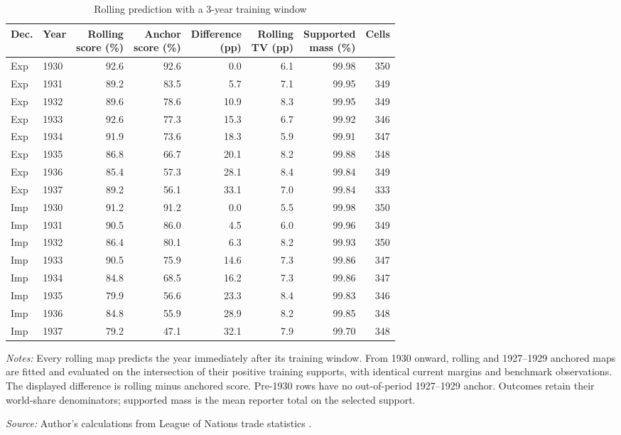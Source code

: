 \begin{table}[!htbp]\centering
\caption{Rolling prediction with a 3-year training window}\label{tab:app_rolling_three}
\begin{threeparttable}\footnotesize\setlength{\tabcolsep}{4pt}
\begin{tabular}{@{}llrrrrrr@{}}
\toprule
Dec. & Year & \shortstack{Rolling\\score (\%)} & \shortstack{Anchor\\score (\%)} & \shortstack{Difference\\(pp)} & \shortstack{Rolling\\TV (pp)} & \shortstack{Supported\\mass (\%)} & Cells \\
\midrule
Exp & 1930 & 92.6 & 92.6 & 0.0 & 6.1 & 99.98 & 350 \\
Exp & 1931 & 89.2 & 83.5 & 5.7 & 7.1 & 99.95 & 349 \\
Exp & 1932 & 89.6 & 78.6 & 10.9 & 8.3 & 99.95 & 349 \\
Exp & 1933 & 92.6 & 77.3 & 15.3 & 6.7 & 99.92 & 346 \\
Exp & 1934 & 91.9 & 73.6 & 18.3 & 5.9 & 99.91 & 347 \\
Exp & 1935 & 86.8 & 66.7 & 20.1 & 8.2 & 99.88 & 348 \\
Exp & 1936 & 85.4 & 57.3 & 28.1 & 8.4 & 99.84 & 349 \\
Exp & 1937 & 89.2 & 56.1 & 33.1 & 7.0 & 99.84 & 333 \\
Imp & 1930 & 91.2 & 91.2 & 0.0 & 5.5 & 99.98 & 350 \\
Imp & 1931 & 90.5 & 86.0 & 4.5 & 6.0 & 99.96 & 349 \\
Imp & 1932 & 86.4 & 80.1 & 6.3 & 8.2 & 99.93 & 350 \\
Imp & 1933 & 90.5 & 75.9 & 14.6 & 7.3 & 99.86 & 347 \\
Imp & 1934 & 84.8 & 68.5 & 16.2 & 7.3 & 99.86 & 347 \\
Imp & 1935 & 79.9 & 56.6 & 23.3 & 8.4 & 99.83 & 346 \\
Imp & 1936 & 84.8 & 55.9 & 28.9 & 8.2 & 99.85 & 348 \\
Imp & 1937 & 79.2 & 47.1 & 32.1 & 7.9 & 99.70 & 348 \\
\bottomrule
\end{tabular}
\begin{tablenotes}[flushleft]\footnotesize\item \textit{Notes:} Every rolling map predicts the year immediately after its training window. From 1930 onward, rolling and 1927--1929 anchored maps are fitted and evaluated on the intersection of their positive training supports, with identical current margins and benchmark observations. The displayed difference is rolling minus anchored score. Pre-1930 rows have no out-of-period 1927--1929 anchor. Outcomes retain their world-share denominators; supported mass is the mean reporter total on the selected support.
\item \textit{Source:} Author's calculations from League of Nations trade statistics \parencite{league1930,league1936,league1938}.
\end{tablenotes}\end{threeparttable}\end{table}
